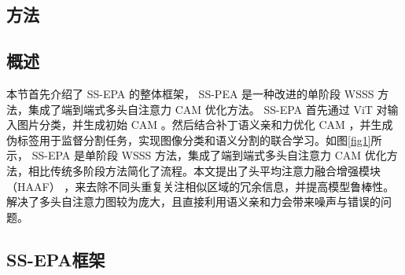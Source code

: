 \begin{CJK*}{UTF8}{zhhei}
    \vskip 1mm
    \section{方法}
\end{CJK*}

\begin{CJK*}{UTF8}{zhhei}
    \subsection{概述}
\end{CJK*}

本节首先介绍了 SS-EPA 的整体框架， SS-PEA 是一种改进的单阶段 WSSS 方法，集成了端到端式多头自注意力 CAM 优化方法。 SS-EPA 首先通过 ViT 对输入图片分类，并生成初始 CAM 。然后结合补丁语义亲和力优化 CAM ，并生成伪标签用于监督分割任务，实现图像分类和语义分割的联合学习。如图\ref{fig1}所示， SS-EPA 是单阶段 WSSS 方法，集成了端到端式多头自注意力 CAM 优化方法，相比传统多阶段方法简化了流程。本文提出了头平均注意力融合增强模块 （HAAF） ，来去除不同头重复关注相似区域的冗余信息，并提高模型鲁棒性。解决了多头自注意力图较为庞大，且直接利用语义亲和力会带来噪声与错误的问题\cite{12xu2022multi}。


\vspace{2mm}

\begin{CJK*}{UTF8}{zhhei}
    \subsection{SS-EPA框架}\label{section3.2}
\end{CJK*}





